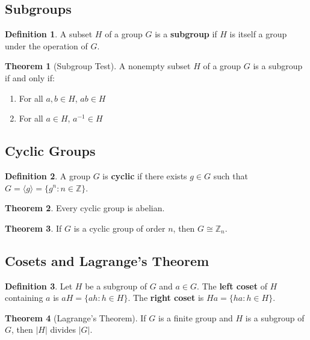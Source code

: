 \documentclass[11pt]{article}
\theoremstyle{definition}
\newtheorem{definition}{Definition}[section]
\newtheorem{theorem}{Theorem}[section]
\begin{document}
\subsection{Subgroups}
\begin{definition}
A subset $H$ of a group $G$ is a \textbf{subgroup} if $H$ is itself a group under the operation of $G$.
\end{definition}

\begin{theorem}[Subgroup Test]
A nonempty subset $H$ of a group $G$ is a subgroup if and only if:
\begin{enumerate}
    \item For all $a, b \in H$, $ab \in H$
    \item For all $a \in H$, $a^{-1} \in H$
\end{enumerate}
\end{theorem}

\subsection{Cyclic Groups}
\begin{definition}
A group $G$ is \textbf{cyclic} if there exists $g \in G$ such that $G = \langle g \rangle = \{g^n : n \in \mathbb{Z}\}$.
\end{definition}

\begin{theorem}
Every cyclic group is abelian.
\end{theorem}

\begin{theorem}
If $G$ is a cyclic group of order $n$, then $G \cong \mathbb{Z}_n$.
\end{theorem}

\subsection{Cosets and Lagrange's Theorem}
\begin{definition}
Let $H$ be a subgroup of $G$ and $a \in G$. The \textbf{left coset} of $H$ containing $a$ is $aH = \{ah : h \in H\}$. The \textbf{right coset} is $Ha = \{ha : h \in H\}$.
\end{definition}

\begin{theorem}[Lagrange's Theorem]
If $G$ is a finite group and $H$ is a subgroup of $G$, then $|H|$ divides $|G|$.
\end{theorem}
\end{document}
